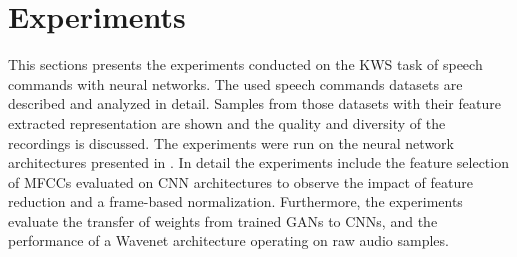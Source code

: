 
\chapter{Experiments}\label{sec:exp}
This sections presents the experiments conducted on the KWS task of speech commands with neural networks.
The used speech commands datasets are described and analyzed in detail.
Samples from those datasets with their feature extracted representation are shown and the quality and diversity of the recordings is discussed.
The experiments were run on the neural network architectures presented in .
In detail the experiments include the feature selection of MFCCs evaluated on CNN architectures to observe the impact of feature reduction and a frame-based normalization.
Furthermore, the experiments evaluate the transfer of weights from trained GANs to CNNs, and the performance of a Wavenet architecture operating on raw audio samples.








